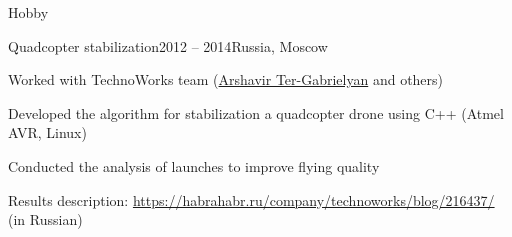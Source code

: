 \documentclass{resume} %
\begin{document}
\begin{rSection}{Hobby}
\begin{rSubsection}{Quadcopter stabilization}{2012 -- 2014}{}{Russia, Moscow}
\item Worked with TechnoWorks team (\href{http://www.pm.inf.ethz.ch/people/person-detail.html?persid=220074}{Arshavir Ter-Gabrielyan} and others)
\item Developed the algorithm for stabilization a quadcopter drone using C++ (Atmel AVR, Linux)
\item Conducted the analysis of launches to improve flying quality
\item Results description: \url{https://habrahabr.ru/company/technoworks/blog/216437/} (in Russian)
\end{rSubsection}

\end{rSection}

\end{document}
